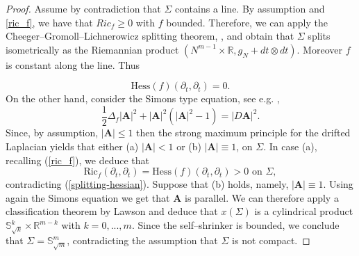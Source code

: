 \documentclass[11pt,leqno]{amsart}\usepackage{amsmath}
\numberwithin{equation}{section}
\begin{document}
\begin{proof}
Assume by contradiction that $\Sigma$ contains a line. By assumption
and \eqref{ric_f}, we have that $Ric_{f}\geq0$ with $f$ bounded. Therefore, we can apply the
Cheeger--Gromoll--Lichnerowicz splitting theorem, \cite{L}, and obtain that
$\Sigma$ splits isometrically as the Riemannian product $\left(  N^{m-1}\times\mathbb{R},g_{N}+dt\otimes dt\right)  $. Moreover $f$ is constant along the
line. Thus

\begin{equation}
\mathrm{Hess}(f)(\partial_{t},\partial_{t})=0.\label{splitting-hessian}\end{equation}
On the other hand, consider the Simons type equation, see e.g. \cite{Hu-JDG, CoMi-Annals2012},
\begin{equation}\label{Simon}
\frac{1}{2}\Delta_{f}\left\vert \mathbf{A}\right\vert ^{2}+\left\vert
\mathbf{A}\right\vert ^{2}\left(  \left\vert \mathbf{A}\right\vert
^{2}-1\right)  =\left\vert D\mathbf{A}\right\vert ^{2}.
\end{equation}
Since, by assumption, $|\mathbf{A}|\leq1$ then the strong maximum principle for the
drifted Laplacian yields that either (a) $|\mathbf{A}|<1$ or (b)
$|\mathbf{A}|\equiv1$, on $\Sigma$. In case (a), recalling (\ref{ric_f}), we
deduce that
\[
\mathrm{Ric}_{f}\left(  \partial_{t},\partial_{t}\right)  =\mathrm{Hess}(f)(\partial_{t},\partial_{t})>0\text{ on }\Sigma,
\]
contradicting (\ref{splitting-hessian}). Suppose that (b) holds, namely,
$|\mathbf{A}|\equiv1$. Using again the Simons equation we get that
$\mathbf{A}$ is parallel. We can therefore apply a classification theorem by
Lawson and deduce that $x(\Sigma)$ is a cylindrical product $\mathbb{S}_{\sqrt{k}}^{k}\times\mathbb{R}^{m-k}$ with $k=0,...,m$. Since the
self--shrinker is bounded, we conclude that $\Sigma=\mathbb{S}_{\sqrt{m}}^{m}$, contradicting the assumption that $\Sigma$ is not compact.
\end{proof}
\end{document}
